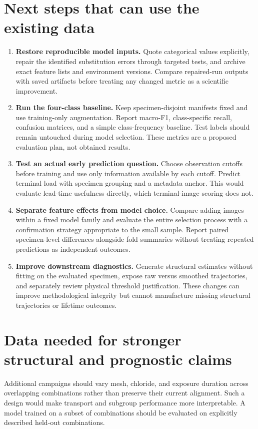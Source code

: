 \section{Next steps that can use the existing data}
\begin{enumerate}
\item \textbf{Restore reproducible model inputs.} Quote categorical values explicitly, repair the identified substitution errors through targeted tests, and archive exact feature lists and environment versions. Compare repaired-run outputs with saved artifacts before treating any changed metric as a scientific improvement.
\item \textbf{Run the four-class baseline.} Keep specimen-disjoint manifests fixed and use training-only augmentation. Report macro-F1, class-specific recall, confusion matrices, and a simple class-frequency baseline. Test labels should remain untouched during model selection. These metrics are a proposed evaluation plan, not obtained results.
\item \textbf{Test an actual early prediction question.} Choose observation cutoffs before training and use only information available by each cutoff. Predict terminal load with specimen grouping and a metadata anchor. This would evaluate lead-time usefulness directly, which terminal-image scoring does not.
\item \textbf{Separate feature effects from model choice.} Compare adding images within a fixed model family and evaluate the entire selection process with a confirmation strategy appropriate to the small sample. Report paired specimen-level differences alongside fold summaries without treating repeated predictions as independent outcomes.
\item \textbf{Improve downstream diagnostics.} Generate structural estimates without fitting on the evaluated specimen, expose raw versus smoothed trajectories, and separately review physical threshold justification. These changes can improve methodological integrity but cannot manufacture missing structural trajectories or lifetime outcomes.
\end{enumerate}

\section{Data needed for stronger structural and prognostic claims}
Additional campaigns should vary mesh, chloride, and exposure duration across overlapping combinations rather than preserve their current alignment. Such a design would make transport and subgroup performance more interpretable. A model trained on a subset of combinations should be evaluated on explicitly described held-out combinations.

